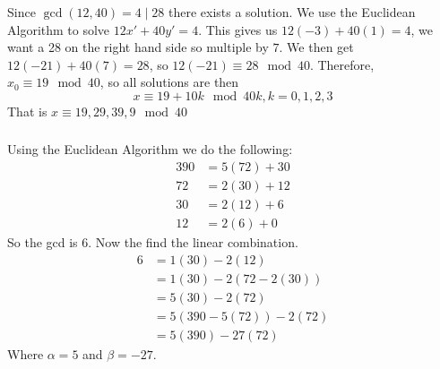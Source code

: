 \documentclass[class=article, crop=false]{standalone}
\begin{document}
\subsubsection{}
Since $\gcd(12,40)=4\mid 28$ there exists a solution. We use the Euclidean Algorithm to solve
	$12x' + 40y' = 4$. This gives us $12(-3)+40(1)=4$, we want a 28 on the right hand side so 
	multiple by $7$. We then get $12(-21)+40(7)=28$, so $12(-21)\equiv 28\mod 40$. Therefore,
	$x_0 \equiv 19\mod 40$, so all solutions are then
	$$x\equiv 19 + 10k\mod 40k, k=0,1,2,3$$
	That is $x\equiv 19, 29, 39, 9\mod 40$

\subsubsection{}
Using the Euclidean Algorithm we do the following:
	\begin{align*}
		390 &= 5(72) + 30 \\
		72 &= 2(30) + 12 \\
		30 &= 2(12) + 6 \\
		12 &= 2(6) + 0
	\end{align*}
	So the gcd is $6$. Now the find the linear combination.
	\begin{align*}
		6 &= 1(30) - 2(12) \\
		&= 1(30) - 2(72 - 2(30)) \\
		&= 5(30) - 2(72) \\
		&= 5(390 - 5(72)) - 2(72) \\
		&= 5(390) - 27(72)
	\end{align*}
	Where $\alpha = 5$ and $\beta = -27$.
\end{document}
